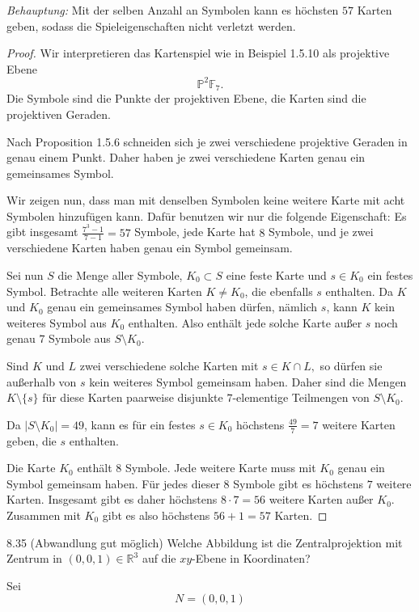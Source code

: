 \textit{Behauptung: } Mit der selben Anzahl an Symbolen kann es höchsten \(57\) Karten geben, sodass die Spieleigenschaften nicht verletzt werden.
\begin{proof}
Wir interpretieren das Kartenspiel wie in Beispiel 1.5.10 als projektive
Ebene
\[
\mathbb P^2\mathbb F_7.
\]
Die Symbole sind die Punkte der projektiven Ebene, die Karten sind die
projektiven Geraden.

Nach Proposition 1.5.6 schneiden sich je zwei verschiedene projektive
Geraden in genau einem Punkt. Daher haben je zwei verschiedene Karten genau
ein gemeinsames Symbol.

Wir zeigen nun, dass man mit denselben Symbolen keine weitere Karte mit
acht Symbolen hinzufügen kann. Dafür benutzen wir nur die folgende Eigenschaft: Es gibt insgesamt $\frac{7^3-1}{7-1}=57$ Symbole, jede Karte
hat \(8\) Symbole, und je zwei verschiedene Karten haben genau ein Symbol
gemeinsam.

Sei nun \(S\) die Menge aller Symbole, \(K_0\subset S\) eine feste Karte und \(s\in K_0\) ein festes Symbol.
Betrachte alle weiteren Karten \(K\neq K_0\), die ebenfalls \(s\) enthalten. Da \(K\) und
\(K_0\) genau ein gemeinsames Symbol haben dürfen, nämlich \(s\), kann
\(K\) kein weiteres Symbol aus \(K_0\) enthalten. Also enthält jede solche
Karte au\ss er \(s\) noch genau \(7\) Symbole aus \(S\setminus K_0\).

Sind \(K\) und \(L\) zwei verschiedene solche Karten mit $s\in K\cap L,$
so dürfen sie au\ss erhalb von \(s\) kein weiteres Symbol gemeinsam haben. Daher sind die Mengen $K\setminus\{s\}$
für diese Karten paarweise disjunkte \(7\)-elementige Teilmengen von
\(S\setminus K_0\).

Da $|S\setminus K_0|=49$, kann es für ein festes \(s\in K_0\) höchstens $\frac{49}{7}=7$ weitere Karten geben, die \(s\) enthalten.

Die Karte \(K_0\) enthält \(8\) Symbole. Jede weitere Karte muss mit
\(K_0\) genau ein Symbol gemeinsam haben. Für jedes dieser \(8\) Symbole gibt es höchstens
\(7\) weitere Karten. Insgesamt gibt es daher höchstens $8\cdot 7=56$ weitere Karten au\ss er \(K_0\).
Zusammen mit \(K_0\) gibt es also höchstens $56+1=57$ Karten.
\end{proof}
\begin{exercise}{8.3}{5 (Abwandlung gut möglich)}
Welche Abbildung ist die Zentralprojektion mit Zentrum in $(0, 0, 1) \in \mathbb{R}^3$
auf die $xy$-Ebene in Koordinaten?
\end{exercise}
Sei
\[
N=(0,0,1)
\]

